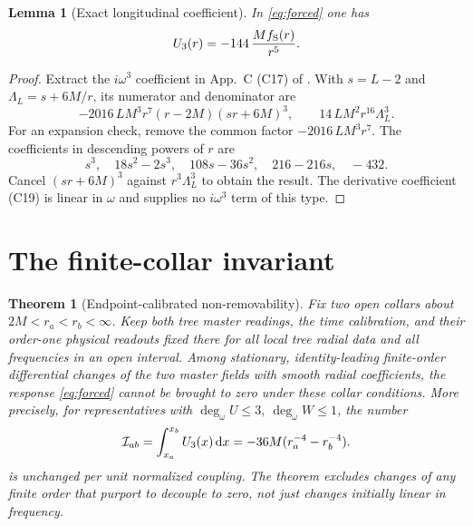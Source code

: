 \documentclass[11pt]{article}
\newtheorem{theorem}{Theorem}
\newtheorem{lemma}{Lemma}
\newcommand{\dd}{\mathrm d}
\begin{document}
\begin{lemma}[Exact longitudinal coefficient]\label{lem:u3}
In \eqref{eq:forced} one has
\[
 U_3(r)=-144\,\frac{M f_{\rm S}(r)}{r^5}.
\]
\end{lemma}
\begin{proof}
Extract the \(i\omega^3\) coefficient in App.~C (C17) of \cite{Cano}. With \(s=L-2\) and \(\Lambda_L=s+6M/r\), its numerator and denominator are
\[
 -2016\, L M^3r^7(r-2M)(sr+6M)^3,\qquad
 14\,L M^2r^{16}\Lambda_L^3 .
\]
For an expansion check, remove the common factor \(-2016\,LM^3r^7\). The coefficients in descending powers of \(r\) are
\[
 s^3,\quad 18s^2-2s^3,\quad 108s-36s^2,\quad 216-216s,\quad -432 .
\]
Cancel \((sr+6M)^3\) against \(r^3\Lambda_L^3\) to obtain the result. The derivative coefficient (C19) is linear in \(\omega\) and supplies no \(i\omega^3\) term of this type.
\end{proof}

\section{The finite-collar invariant}

\begin{theorem}[Endpoint-calibrated non-removability]\label{thm:collar}
Fix two open collars about \(2M<r_a<r_b<\infty\). Keep both tree master readings, the time calibration, and their order-one physical readouts fixed there for all local tree radial data and all frequencies in an open interval. Among stationary, identity-leading finite-order differential changes of the two master fields with smooth radial coefficients, the response \eqref{eq:forced} cannot be brought to zero under these collar conditions. More precisely, for representatives with \(\deg_\omega U\le3,\ \deg_\omega W\le1\), the number
\begin{equation}
 {\cal I}_{ab}=\int_{x_a}^{x_b} U_3(x)\,\dd x
       =-36M(r_a^{-4}-r_b^{-4}).
 \label{eq:invariant}
\end{equation}
is unchanged per unit normalized coupling. The theorem excludes changes of any finite order that purport to decouple to zero, not just changes initially linear in frequency.
\end{theorem}
\end{document}
